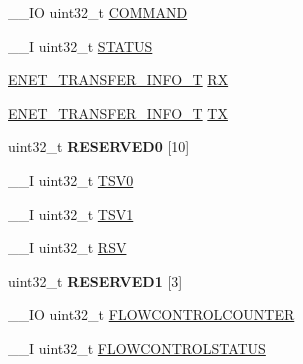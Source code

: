 \begin{DoxyCompactItemize}
\item 
\+\_\+\+\_\+\+I\+O uint32\+\_\+t \hyperlink{struct_e_n_e_t___c_o_n_t_r_o_l___t_a5c6633c6ca37621d5f23513ebca2bd17}{C\+O\+M\+M\+A\+N\+D}
\item 
\+\_\+\+\_\+\+I uint32\+\_\+t \hyperlink{struct_e_n_e_t___c_o_n_t_r_o_l___t_aaaef8a4b3d2a27e488d5e2e8a236640a}{S\+T\+A\+T\+U\+S}
\item 
\hyperlink{struct_e_n_e_t___t_r_a_n_s_f_e_r___i_n_f_o___t}{E\+N\+E\+T\+\_\+\+T\+R\+A\+N\+S\+F\+E\+R\+\_\+\+I\+N\+F\+O\+\_\+\+T} \hyperlink{struct_e_n_e_t___c_o_n_t_r_o_l___t_a3b07c9a812059f852415f8b5a5261882}{R\+X}
\item 
\hyperlink{struct_e_n_e_t___t_r_a_n_s_f_e_r___i_n_f_o___t}{E\+N\+E\+T\+\_\+\+T\+R\+A\+N\+S\+F\+E\+R\+\_\+\+I\+N\+F\+O\+\_\+\+T} \hyperlink{struct_e_n_e_t___c_o_n_t_r_o_l___t_a1010eaf24cd6af0d6355b4cd34d8e90a}{T\+X}
\item 
\hypertarget{struct_e_n_e_t___c_o_n_t_r_o_l___t_a662f1911bc2db756493ef2dd77e83be5}{uint32\+\_\+t {\bfseries R\+E\+S\+E\+R\+V\+E\+D0} \mbox{[}10\mbox{]}}\label{struct_e_n_e_t___c_o_n_t_r_o_l___t_a662f1911bc2db756493ef2dd77e83be5}

\item 
\+\_\+\+\_\+\+I uint32\+\_\+t \hyperlink{struct_e_n_e_t___c_o_n_t_r_o_l___t_adfd0bf0a173cb107271eba4fa8f20de8}{T\+S\+V0}
\item 
\+\_\+\+\_\+\+I uint32\+\_\+t \hyperlink{struct_e_n_e_t___c_o_n_t_r_o_l___t_a03b03ad79457f3f25cc3d1d2d564310a}{T\+S\+V1}
\item 
\+\_\+\+\_\+\+I uint32\+\_\+t \hyperlink{struct_e_n_e_t___c_o_n_t_r_o_l___t_a5817f844b6195193d1536edbc770e72f}{R\+S\+V}
\item 
\hypertarget{struct_e_n_e_t___c_o_n_t_r_o_l___t_a83f993318d9638ea36fa88d8f5bcb957}{uint32\+\_\+t {\bfseries R\+E\+S\+E\+R\+V\+E\+D1} \mbox{[}3\mbox{]}}\label{struct_e_n_e_t___c_o_n_t_r_o_l___t_a83f993318d9638ea36fa88d8f5bcb957}

\item 
\+\_\+\+\_\+\+I\+O uint32\+\_\+t \hyperlink{struct_e_n_e_t___c_o_n_t_r_o_l___t_a988aac51d07bd4d330945f74f3747084}{F\+L\+O\+W\+C\+O\+N\+T\+R\+O\+L\+C\+O\+U\+N\+T\+E\+R}
\item 
\+\_\+\+\_\+\+I uint32\+\_\+t \hyperlink{struct_e_n_e_t___c_o_n_t_r_o_l___t_abe816b0eaea3b8dcb126cbe565d81ffb}{F\+L\+O\+W\+C\+O\+N\+T\+R\+O\+L\+S\+T\+A\+T\+U\+S}
\end{DoxyCompactItemize}


